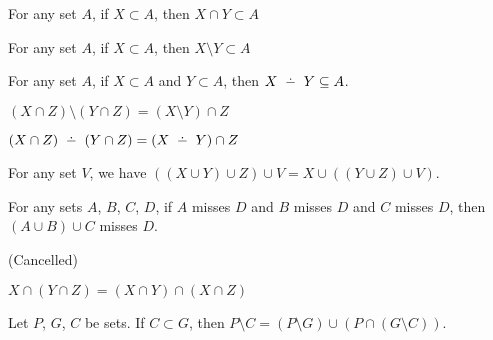 \begin{thm}
\item\label{xboole1:108} For any set $A$, if $X \subset A$, then $X \cap Y \subset A$
\item\label{xboole1:109} For any set $A$, if $X \subset A$, then $X \setminus Y \subset A$
\item\label{xboole1:110} For any set $A$, if $X \subset A$ and $Y \subset A$, then
$X \symdiff Y \subset A$.
\item\label{xboole1:111} $(X \cap Z) \setminus (Y \cap Z) = (X \setminus Y) \cap Z$
\item\label{xboole1:112} $(X \cap Z) \symdiff (Y \cap Z) = (X \symdiff Y) \cap Z$
\item\label{xboole1:113} For any set $V$, we have $((X \cup Y) \cup Z) \cup V = X \cup ((Y \cup Z) \cup V)$.
\item\label{xboole1:114} For any sets $A$, $B$, $C$, $D$, if $A$ misses
  $D$ and $B$ misses $D$ and $C$ misses $D$, then $(A\cup B)\cup C$
  misses $D$.
\item\label{xboole1:115} (Cancelled)
\item\label{xboole1:116} $X \cap (Y \cap Z) = (X \cap Y) \cap (X \cap Z)$
\item\label{xboole1:117} Let $P$, $G$, $C$ be sets. If $C\subset G$,
  then $P\setminus C = (P\setminus G)\cup (P\cap(G\setminus C))$.
\end{thm}

